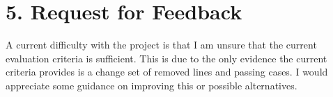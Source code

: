 \documentclass[11pt, a4paper, twoside, openright]{report}
\begin{document}
\section*{5. Request for Feedback}


A current difficulty with the project is that I am unsure that the current
evaluation criteria is sufficient.
This is due to the only evidence the current criteria provides is a change set
of removed lines and passing cases. I would appreciate some guidance on
improving this or possible alternatives.



\backmatter{}

%




\end{document}
